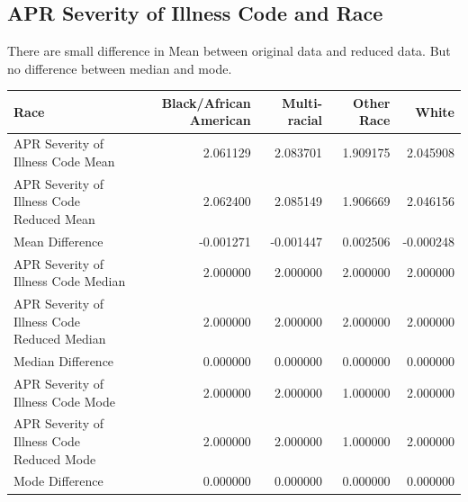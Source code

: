\documentclass[
	letterpaper, %
]{jdf}
\begin{document}
\subsection{APR Severity of Illness Code and Race}
There are small difference in Mean between original data and reduced data. But no difference between median and mode.  
\begin{jdftable}
\label{table:Example}
\small %
\begin{tabular}{@{} lrrrr}
\textbf{Race} & \textbf{Black/African American} &\textbf{Multi-racial} & \textbf{Other Race} &\textbf{White}\\
	\toprule[0.5pt]
APR Severity of Illness Code Mean           &                2.061129 &      2.083701 &    1.909175 &  2.045908 \\\midrule
APR Severity of Illness Code Reduced Mean   &                2.062400 &      2.085149 &    1.906669 &  2.046156 \\\midrule
Mean Difference                             &               -0.001271 &     -0.001447 &    0.002506 & -0.000248 \\\midrule
APR Severity of Illness Code Median         &                2.000000 &      2.000000 &    2.000000 &  2.000000 \\\midrule
APR Severity of Illness Code Reduced Median &                2.000000 &      2.000000 &    2.000000 &  2.000000 \\\midrule
Median Difference                           &                0.000000 &      0.000000 &    0.000000 &  0.000000 \\\midrule
APR Severity of Illness Code Mode           &                2.000000 &      2.000000 &    1.000000 &  2.000000 \\\midrule
APR Severity of Illness Code Reduced Mode   &                2.000000 &      2.000000 &    1.000000 &  2.000000 \\\midrule
Mode Difference                             &                0.000000 &      0.000000 &    0.000000 &  0.000000 \\
\end{tabular}
\end{jdftable}
\end{document}

